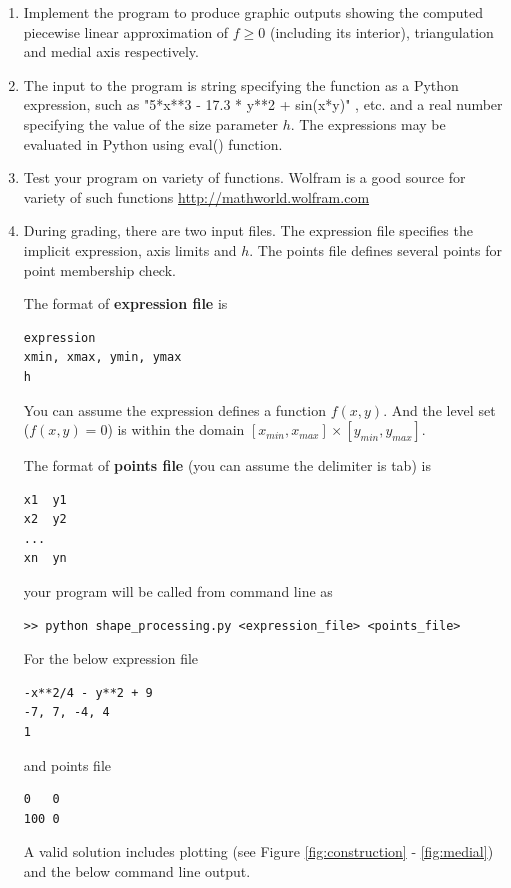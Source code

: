 \documentclass[11pt]{article}
\begin{document}
\begin{enumerate}

\item 
Implement the program to produce graphic outputs showing the computed piecewise linear approximation of $f \ge 0$ (including its interior), triangulation and medial axis respectively.

\item The input to the program is string  specifying the function as a Python expression,   such as    "5*x**3 - 17.3 * y**2 + sin(x*y)" , etc.  and a real number specifying the value of the size parameter $h$. 
The expressions may be evaluated in Python using eval() function.  

\item
Test your program on variety of functions.  Wolfram is a good source for variety of such functions
\href{http://mathworld.wolfram.com}{http://mathworld.wolfram.com}

\item
During grading, there are two input files. The expression file specifies the implicit expression, axis limits and $h$. The points file defines several points for point membership check. 

The format of \textbf{expression file} is
\begin{lstlisting}
expression
xmin, xmax, ymin, ymax
h
\end{lstlisting}
You can assume the expression defines a function $f(x, y)$. And the level set ($f(x, y) = 0$) is within the domain $[x_{min}, x_{max}] \times [y_{min}, y_{max}]$. 

The format of \textbf{points file} (you can assume the delimiter is tab) is
\begin{lstlisting}
x1	y1
x2	y2
...
xn	yn
\end{lstlisting}

your program will be called from command line as
\begin{lstlisting}
>> python shape_processing.py <expression_file> <points_file>
\end{lstlisting}

For the below expression file
\begin{lstlisting}
-x**2/4 - y**2 + 9
-7, 7, -4, 4
1
\end{lstlisting}
and points file
\begin{lstlisting}
0	0
100	0
\end{lstlisting}

A valid solution includes plotting (see Figure \ref{fig:construction} - \ref{fig:medial}) and the below command line output. 


\end{enumerate}
\end{document}

